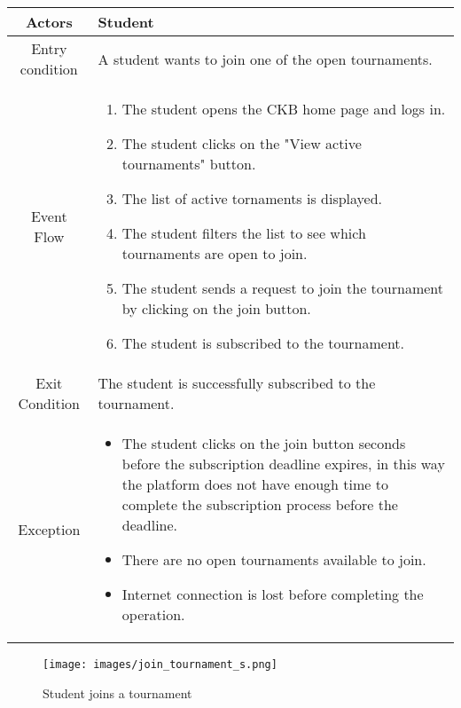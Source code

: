 \documentclass[a4paper, 11pt, titlepage]{article}
\begin{document}
\begin{center}
    \begin{tabularx}{\linewidth} {|c|X|}
        \hline 
        Actors & Student\\
        \hline 
        Entry condition &
            A student wants to join one of the open tournaments.\\
        \hline 
        Event Flow &
        \begin{enumerate}
            \item The student opens the CKB home page and logs in.
            \item The student clicks on the "View active tournaments" button.
            \item The list of active tornaments is displayed.
            \item The student filters the list to see which tournaments are open to join.
            \item The student sends a request to join the tournament by clicking on the join button.
            \item The student is subscribed to the tournament.
        \end{enumerate}\\
        \hline 
        Exit Condition & The student is successfully subscribed to the tournament.\\
        \hline 
        Exception & 
        \begin{itemize}
            \item The student clicks on the join button seconds before the subscription deadline expires, in this way the platform does not have 
            enough time to complete the subscription process before the deadline.
            \item There are no open tournaments available to join.
            \item Internet connection is lost before completing the operation.
        \end{itemize} \\
        \hline
    \end{tabularx}
\end{center}

\begin{figure}[h!]
    \centering
    \texttt{[image: images/join\_tournament\_s.png]}
    \caption{Student joins a tournament}
    \label{fig:seq_diag_tournament_join}
    
\end{figure}
\end{document}
